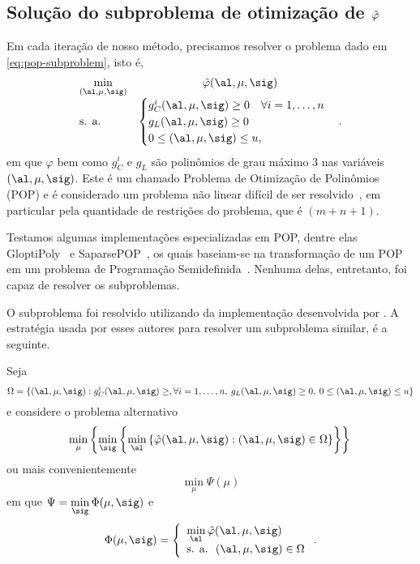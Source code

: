 



\subsection{Solução do subproblema de otimização \texorpdfstring{de $\hat{\varphi}$}{da função de mérito}}

Em cada iteração de nosso método, precisamos resolver o problema dado em \eqref{eq:pop-subproblem}, isto é, 
\begin{equation}
	\label{eq:pop-subproblem-1}
	\begin{array}{lc}
\displaystyle \min_{(\al,\mu,\sig)} & \hat\varphi(\al,\mu,\sig) \\
\text{s. a.} &\begin{cases} g_C^i(\al,\mu,\sig) \geq 0 \quad \forall i = 1,\ldots,n \\
				g_L(\al,\mu,\sig)   \geq 0 	\\
				 0\leq (\al,\mu,\sig) \leq u,
				 	
				 \end{cases}.
\end{array}
\end{equation}
em que $\varphi$ bem como $g_{C}^{i}$ e $g_{L}$ são polinômios de grau máximo 3 nas variáveis $(\al,\mu,\sig)$. Este é um chamado Problema de Otimização de Polinômios (POP) e é considerado um problema não linear  difícil de ser resolvido~\cite{Laurent:2010kp}, em particular pela quantidade de restrições do problema, que é  $(m+n+1)$. 

Testamos algumas  implementações especializadas em POP, dentre elas GloptiPoly~\cite{Henrion:2009eb} e SaparsePOP~\cite{Waki:2008ie}, os quais baseiam-se na transformação de um POP em um problema de Programação Semidefinida~\cite{Lasserre:2001fw}. Nenhuma delas, entretanto, foi capaz de resolver os subproblemas. 


O subproblema foi resolvido utilizando da implementação desenvolvida por \textcite{VillasBoas:2012ur,VillasBoas2013:wn}. A estratégia usada por esses autores para resolver um subproblema similar, é a seguinte.

Seja
\[\Omega = \{(\al,\mu,\sig): g_C^i(\al,\mu,\sig) \geq, \forall i = 1,\ldots,n,\: g_L(\al,\mu,\sig)   \geq 0,\:		 0\leq (\al,\mu,\sig) \leq u\}\]
e considere o problema alternativo
\begin{equation}
		\label{eq:pop-subproblem-2}
\displaystyle  \min_{\mu}\left\{  \min_{\sig} \left\{ \min_{\al} \left\{ \nextphi(\al,\mu,\sig):    (\al,\mu,\sig) \in \Omega  \right\} \right\}\right\} \\
\end{equation}
ou mais convenientemente 
\[
\displaystyle \min_{\mu}\Psi(\mu)
\]
em que  $\displaystyle \Psi = \min_{\sig}\Phi(\mu,\sig)$ e 
\[
\Phi(\mu,\sig) = \left\{
	\begin{array}{l}
\displaystyle \min_{\al}  \nextphi(\al,\mu,\sig) \\
\text{s. a. }\:  (\al,\mu,\sig) \in\Omega
\end{array}\right..
\]
  

